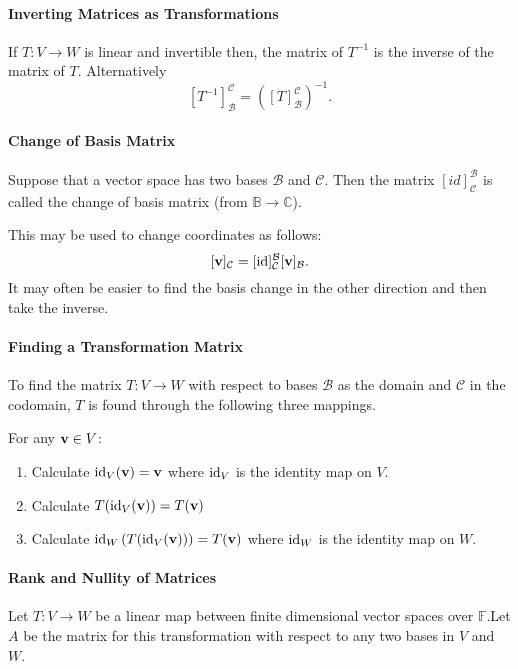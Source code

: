 \paragraph{Inverting Matrices as Transformations}
If \(T: V \to W\) is linear and invertible then, the matrix of \(T^{-1}\)
is the inverse of the matrix of \(T\).
Alternatively \[
    [T^{-1}]_\mathcal{B}^\mathcal{C}
    =
    \left( [T]_\mathcal{B}^\mathcal{C} \right)^{-1}
.\]

\paragraph{Change of Basis Matrix}
Suppose that a vector space has two bases \(\mathcal{B}\) and \(\mathcal{C}\).
Then the matrix \([id]_\mathcal{C}^\mathcal{B}\) is called the
change of basis matrix (from \(\mathbb{B} \to \mathbb{C}\)).

This may be used to change coordinates as follows: \[
    [\mathbf{v}]_\mathcal{C}
    =
    [\mathrm{id}]_\mathcal{C}^\mathcal{B} [\mathbf{v}]_\mathcal{B}
.\]
It may often be easier to find the basis change in the other direction and
then take the inverse.

\paragraph{Finding a Transformation Matrix}
To find the matrix \(T: V \to W\) with respect to bases \(\mathcal{B}\)
as the domain and \(\mathcal{C}\) in the codomain, \(T\) is found through the
following three mappings.

For any  \(\mathbf{v} \in V\):
\begin{enumerate}
    \item Calculate \(\mathrm{id}_V (\mathbf{v}) = \mathbf{v}\) where \(\mathrm{id}_V\) is the identity
        map on \(V\).
    \item Calculate \(T(\mathrm{id}_V(\mathbf{v})) = T(\mathbf{v}) \)
    \item Calculate \(
        \mathrm{id}_W \left( T (\mathrm{id}_V(\mathbf{v})) \right) = T(\mathbf{v})\)
        where \(\mathrm{id}_W\) is the identity map on \(W\).
\end{enumerate}


\paragraph{Rank and Nullity of Matrices}
Let \(T: V \to W\) be a linear map between finite dimensional vector spaces
over \(\mathbb{F}\).Let \(A\) be the matrix for this transformation
with respect to any two bases in \(V\) and \(W\).

